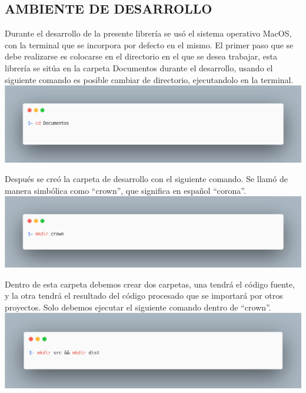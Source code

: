 \subsection{AMBIENTE DE DESARROLLO}
Durante el desarrollo de la presente librería se usó el sistema operativo MacOS, con la terminal que se incorpora por defecto en el mismo.
El primer paso que se debe realizarse es colocarse en el directorio en el que se desea trabajar, esta librería se sitúa en la carpeta Documentos durante el desarrollo, usando el siguiente comando es posible cambiar de directorio, ejecutandolo en la terminal.
 \newline
 \newline
\includegraphics[width=1\textwidth]{./Imagenes/image15.png}
 \newline
 
 Después se creó la carpeta de desarrollo con el siguiente comando. Se llamó de manera simbólica como “crown”, que significa en español “corona”.
 \newline
\newline
\includegraphics[width=1\textwidth]{./Imagenes/image7.png}
\newline

Dentro de esta carpeta debemos crear dos carpetas, una tendrá el código fuente, y la otra tendrá el resultado del código procesado que se importará por otros proyectos. Solo debemos ejecutar el siguiente comando dentro de “crown”.
 \newline
\newline
\includegraphics[width=1\textwidth]{./Imagenes/image37.png}
\newline


